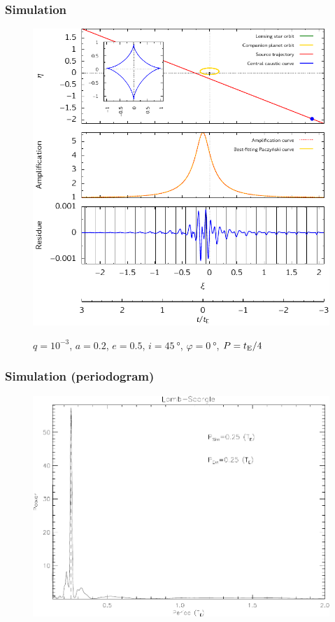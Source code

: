 \documentclass[10pt]{beamer}
\renewcommand{\phi}{\varphi}
\begin{document}
\begin{frame}
  \frametitle{Simulation}
  \begin{figure}
    \centering
    \vspace{-0.5em}
    \href{run:./movie.mp4}{
      \includegraphics[width=0.6\columnwidth]{figures/figure2}}
    \caption{\(q = 10^{-3}\), \(a = 0.2\), \(e = 0.5\), \(i =
      \SI{45}{\degree}\), \(\phi = \SI{0}{\degree}\), \(P = t_{\textup{E}}/4\)}
    \vspace{-1.2em}
  \end{figure}
\end{frame}

\begin{frame}
  \frametitle{Simulation (periodogram)}
  \begin{figure}
    \centering
    \includegraphics[width=0.85\columnwidth]{figures/lombscargle2}
  \end{figure}
\end{frame}
\end{document}
